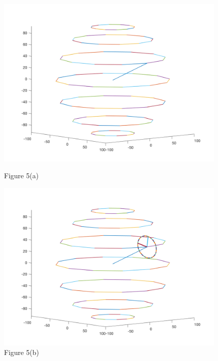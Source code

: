 \documentclass[12pt]{article}
\renewcommand{\(}{\left (}
\renewcommand{\)}{\right )}
\begin{document}
\begin{figure}[ht]
	\begin{minipage}{0.33\textwidth}
		\centering
		\includegraphics[width=0.99\textwidth]{earth_structure.png}
		\caption*{\small Figure 5(a)}
	\end{minipage}
	\begin{minipage}{0.33\textwidth}
		\centering
		\includegraphics[width=0.99\textwidth]{track_structure.png}
		\caption*{\small Figure 5(b)}
	\end{minipage}
	\begin{minipage}{0.33\textwidth}
		\centering

\end{minipage}
\end{figure}
\end{document}
